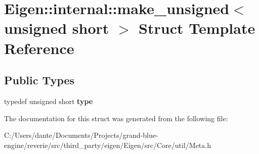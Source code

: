 \hypertarget{struct_eigen_1_1internal_1_1make__unsigned_3_01unsigned_01short_01_4}{}\section{Eigen\+::internal\+::make\+\_\+unsigned$<$ unsigned short $>$ Struct Template Reference}
\label{struct_eigen_1_1internal_1_1make__unsigned_3_01unsigned_01short_01_4}
\subsection*{Public Types}
\begin{DoxyCompactItemize}
\item 
\mbox{\label{struct_eigen_1_1internal_1_1make__unsigned_3_01unsigned_01short_01_4_a09c86274e215977ef8ad083813cf1fec}} 
typedef unsigned short {\bfseries type}
\end{DoxyCompactItemize}


The documentation for this struct was generated from the following file\+:\begin{DoxyCompactItemize}
\item 
C\+:/\+Users/dante/\+Documents/\+Projects/grand-\/blue-\/engine/reverie/src/third\+\_\+party/eigen/\+Eigen/src/\+Core/util/Meta.\+h\end{DoxyCompactItemize}
